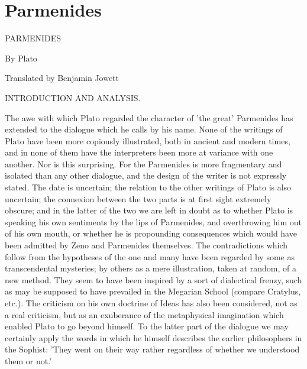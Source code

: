 \chapter{Parmenides} %
\label{cha:parmenides}


PARMENIDES

By Plato


Translated by Benjamin Jowett




INTRODUCTION AND ANALYSIS.

The awe with which Plato regarded the character of 'the great'
Parmenides has extended to the dialogue which he calls by his name. None
of the writings of Plato have been more copiously illustrated, both in
ancient and modern times, and in none of them have the interpreters
been more at variance with one another. Nor is this surprising. For the
Parmenides is more fragmentary and isolated than any other dialogue, and
the design of the writer is not expressly stated. The date is uncertain;
the relation to the other writings of Plato is also uncertain; the
connexion between the two parts is at first sight extremely obscure;
and in the latter of the two we are left in doubt as to whether Plato is
speaking his own sentiments by the lips of Parmenides, and overthrowing
him out of his own mouth, or whether he is propounding consequences
which would have been admitted by Zeno and Parmenides themselves. The
contradictions which follow from the hypotheses of the one and many have
been regarded by some as transcendental mysteries; by others as a mere
illustration, taken at random, of a new method. They seem to have been
inspired by a sort of dialectical frenzy, such as may be supposed to
have prevailed in the Megarian School (compare Cratylus, etc.). The
criticism on his own doctrine of Ideas has also been considered, not as
a real criticism, but as an exuberance of the metaphysical imagination
which enabled Plato to go beyond himself. To the latter part of the
dialogue we may certainly apply the words in which he himself describes
the earlier philosophers in the Sophist: 'They went on their way rather
regardless of whether we understood them or not.'

